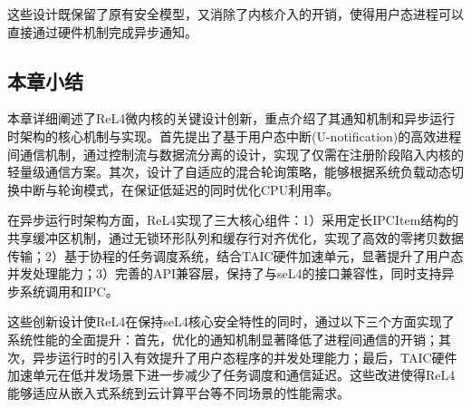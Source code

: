 这些设计既保留了原有安全模型，又消除了内核介入的开销，使得用户态进程可以直接通过硬件机制完成异步通知。

\subsection{本章小结}
本章详细阐述了ReL4微内核的关键设计创新，重点介绍了其通知机制和异步运行时架构的核心机制与实现。首先提出了基于用户态中断(U-notification)的高效进程间通信机制，通过控制流与数据流分离的设计，实现了仅需在注册阶段陷入内核的轻量级通信方案。其次，设计了自适应的混合轮询策略，能够根据系统负载动态切换中断与轮询模式，在保证低延迟的同时优化CPU利用率。

在异步运行时架构方面，ReL4实现了三大核心组件：1）采用定长IPCItem结构的共享缓冲区机制，通过无锁环形队列和缓存行对齐优化，实现了高效的零拷贝数据传输；2）基于协程的任务调度系统，结合TAIC硬件加速单元，显著提升了用户态并发处理能力；3）完善的API兼容层，保持了与seL4的接口兼容性，同时支持异步系统调用和IPC。

这些创新设计使ReL4在保持seL4核心安全特性的同时，通过以下三个方面实现了系统性能的全面提升：首先，优化的通知机制显著降低了进程间通信的开销；其次，异步运行时的引入有效提升了用户态程序的并发处理能力；最后，TAIC硬件加速单元在低并发场景下进一步减少了任务调度和通信延迟。这些改进使得ReL4能够适应从嵌入式系统到云计算平台等不同场景的性能需求。